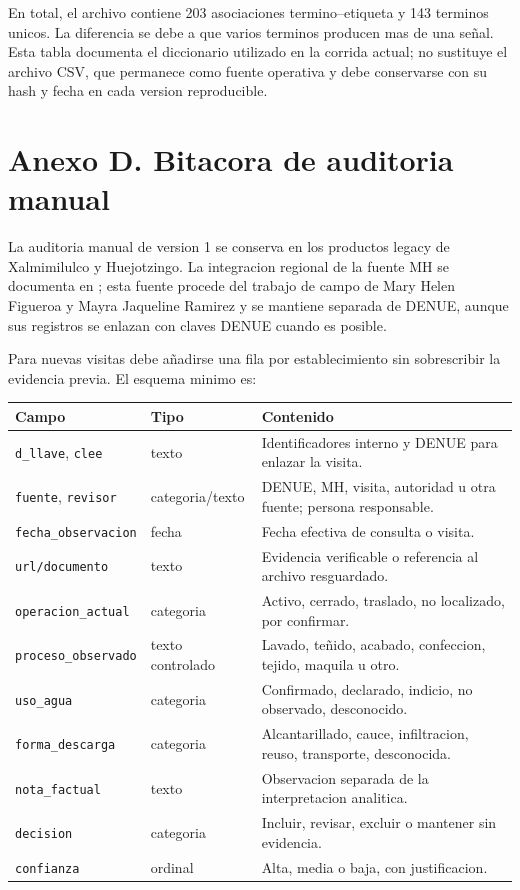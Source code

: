 \documentclass[11pt,letterpaper]{article}
\begin{document}
En total, el archivo contiene 203 asociaciones termino--etiqueta y 143 terminos unicos. La diferencia se debe a que varios terminos producen mas de una señal. Esta tabla documenta el diccionario utilizado en la corrida actual; no sustituye el archivo CSV, que permanece como fuente operativa y debe conservarse con su hash y fecha en cada version reproducible.

\section{Anexo D. Bitacora de auditoria manual}

La auditoria manual de version 1 se conserva en los productos legacy de Xalmimilulco y Huejotzingo. La integracion regional de la fuente MH se documenta en ; esta fuente procede del trabajo de campo de Mary Helen Figueroa y Mayra Jaqueline Ramirez y se mantiene separada de DENUE, aunque sus registros se enlazan con claves DENUE cuando es posible.

Para nuevas visitas debe añadirse una fila por establecimiento sin sobrescribir la evidencia previa. El esquema minimo es:

\begin{longtable}{p{}p{}p{}}
\toprule
\textbf{Campo} & \textbf{Tipo} & \textbf{Contenido} \\
\midrule
\texttt{d\_llave}, \texttt{clee} & texto & Identificadores interno y DENUE para enlazar la visita. \\
\texttt{fuente}, \texttt{revisor} & categoria/texto & DENUE, MH, visita, autoridad u otra fuente; persona responsable. \\
\texttt{fecha\_observacion} & fecha & Fecha efectiva de consulta o visita. \\
\texttt{url/documento} & texto & Evidencia verificable o referencia al archivo resguardado. \\
\texttt{operacion\_actual} & categoria & Activo, cerrado, traslado, no localizado, por confirmar. \\
\texttt{proceso\_observado} & texto controlado & Lavado, teñido, acabado, confeccion, tejido, maquila u otro. \\
\texttt{uso\_agua} & categoria & Confirmado, declarado, indicio, no observado, desconocido. \\
\texttt{forma\_descarga} & categoria & Alcantarillado, cauce, infiltracion, reuso, transporte, desconocida. \\
\texttt{nota\_factual} & texto & Observacion separada de la interpretacion analitica. \\
\texttt{decision} & categoria & Incluir, revisar, excluir o mantener sin evidencia. \\
\texttt{confianza} & ordinal & Alta, media o baja, con justificacion. \\
\bottomrule
\end{longtable}
\end{document}
